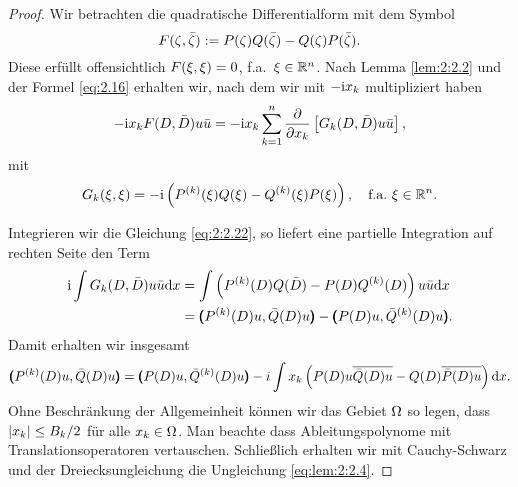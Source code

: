 \begin{proof}
Wir betrachten die quadratische Differentialform mit dem Symbol
\begin{equation}
F(\zeta,\bar{\zeta}):=P(\zeta)Q(\bar{\zeta})-Q(\zeta)P(\bar{\zeta}).
\end{equation}
Diese erfüllt offensichtlich $F(\xi,\xi)=0$, f.a.~$\xi\in\mathbb R^n$.
Nach Lemma \ref{lem:2:2.2} und der Formel \eqref{eq:2.16}
erhalten wir, nach dem wir mit $-\mathrm i x_k$ multipliziert haben
\begin{equation}\label{eq:2:2.22}
-\mathrm i x_kF(D,\bar{D})u\bar{u}=-\mathrm i x_k\sum_{k=1}^n\frac{\partial}{\partial x_k}\left[G_k(D,\bar{D})u\bar{u}\right],
\end{equation}
mit
\begin{equation}
G_k(\xi,\xi)=-\mathrm i\left(P^{(k)}(\xi)Q(\xi)-Q^{(k)}(\xi)P(\xi)\right),
\quad\text{f.a.}~\xi\in\mathbb R^n.
\end{equation}

Integrieren wir die Gleichung \eqref{eq:2:2.22},
so liefert eine partielle Integration auf rechten Seite den Term
\begin{align}
\mathrm i\int G_k(D,\bar{D})u\bar{u}\mathrm{d} x&=\int\left(P^{(k)}(D)Q(\bar{D})-P(D)Q^{(k)}(D)\right)u\bar{u}\mathrm{d} x\\
&=\pmb(P^{(k)}(D)u,\bar{Q}(D)u\pmb)-\pmb(P(D)u,\bar{Q}^{(k)}(D)u\pmb).
\end{align}
Damit erhalten wir insgesamt
\begin{equation}
\pmb(P^{(k)}(D)u,\bar{Q}(D)u\pmb)
=\pmb(P(D)u,\bar{Q}^{(k)}(D)u\pmb)-i\int x_k\left(P(D)u\overline{\bar{Q}(D)u}-Q(D)\overline{\bar{P}(D)u}\right)\mathrm{d} x.
\end{equation}
Ohne Beschränkung der Allgemeinheit können wir das Gebiet $\Omega$ so legen,
dass $\lvert x_k\rvert\leq B_k/2$ für alle $x_k\in\Omega$.
Man beachte dass Ableitungspolynome mit Translationsoperatoren vertauschen.
Schließlich erhalten wir mit Cauchy-Schwarz
und der Dreiecksungleichung die Ungleichung \eqref{eq:lem:2:2.4}.
\end{proof}

